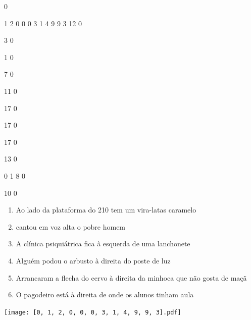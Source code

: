 \documentclass[12pt]{article}
\begin{document}
		\vfill  
		  
{
	0	%

	1	%
	2	%
	0	%
	0	%
	0	%
	3	%
	1	%
	4	%
	9	%
	9	%
	3	%
	12	%
	0	%

	3	%
	0	%

	1	%
	0	%

	7	%
	0	%

	11	%
	0	%

	17	%
	0	%

	17	%
	0	%

	17	%
	0	%

	13	%
	0	%

	0	%
	1	%
	8	%
	0	%

	10	%
	0	%

}	  
		    	

		 

\pagebreak


	\begin{enumerate}
		  \sffamily %
		  \large %


\vfill \item
Ao lado da plataforma do 210	%
tem um vira-latas caramelo	%

\vfill \item
cantou em voz alta	%
o pobre homem	%

\vfill \item
A clínica psiquiátrica fica	%
à esquerda
de uma lanchonete	%

\vfill \item
Alguém podou o arbusto	%
à direita
do poste de luz	%

\vfill \item
Arrancaram a flecha do cervo	%
à direita
da minhoca que não gosta de maçã	%

\vfill \item
O pagodeiro está	%
à direita
de onde os alunos tinham aula	%
	\end{enumerate}
		  
		  \hfill

		  \vfill

\texttt{[image: [0, 1, 2, 0, 0, 0, 3, 1, 4, 9, 9, 3].pdf]}
\end{document}
